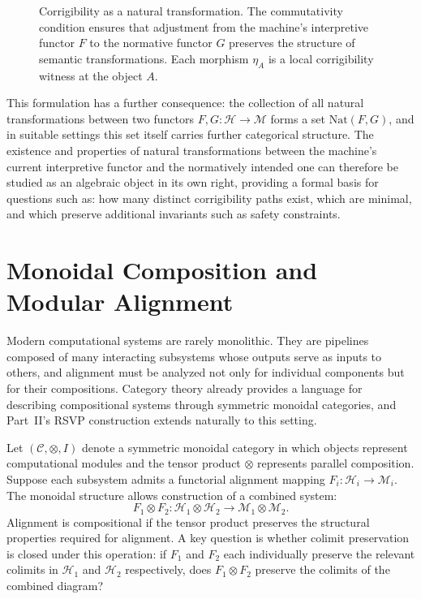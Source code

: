 \documentclass[12pt]{article}
\theoremstyle{definition}
\begin{document}
\begin{figure}[h]
\centering
{}
\caption{Corrigibility as a natural transformation. The commutativity condition
ensures that adjustment from the machine's interpretive functor $F$ to the
normative functor $G$ preserves the structure of semantic transformations. Each
morphism $\eta_A$ is a local corrigibility witness at the object $A$.}
\end{figure}

This formulation has a further consequence: the collection of all natural
transformations between two functors $F, G : \mathcal{H} \to \mathcal{M}$ forms
a set $\mathrm{Nat}(F, G)$, and in suitable settings this set itself carries
further categorical structure. The existence and properties of natural
transformations between the machine's current interpretive functor and the
normatively intended one can therefore be studied as an algebraic object in its
own right, providing a formal basis for questions such as: how many distinct
corrigibility paths exist, which are minimal, and which preserve additional
invariants such as safety constraints.

\section{Monoidal Composition and Modular Alignment}

Modern computational systems are rarely monolithic. They are pipelines composed
of many interacting subsystems whose outputs serve as inputs to others, and
alignment must be analyzed not only for individual components but for their
compositions. Category theory already provides a language for describing
compositional systems through symmetric monoidal categories, and Part~II's
RSVP construction extends naturally to this setting.

Let $(\mathcal{C}, \otimes, I)$ denote a symmetric monoidal category in which
objects represent computational modules and the tensor product $\otimes$
represents parallel composition. Suppose each subsystem admits a functorial
alignment mapping $F_i : \mathcal{H}_i \to \mathcal{M}_i$. The monoidal
structure allows construction of a combined system:
\begin{equation}
  F_1 \otimes F_2 : \mathcal{H}_1 \otimes \mathcal{H}_2 \to
  \mathcal{M}_1 \otimes \mathcal{M}_2.
\end{equation}
Alignment is compositional if the tensor product preserves the structural
properties required for alignment. A key question is whether colimit preservation
is closed under this operation: if $F_1$ and $F_2$ each individually preserve
the relevant colimits in $\mathcal{H}_1$ and $\mathcal{H}_2$ respectively, does
$F_1 \otimes F_2$ preserve the colimits of the combined diagram?
\end{document}
